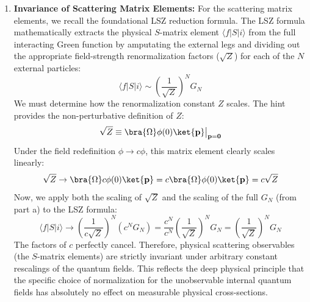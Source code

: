 \begin{enumerate}[label=(\alph*)]
    \item \textbf{Invariance of Scattering Matrix Elements:}
          For the scattering matrix elements, we recall the foundational LSZ reduction formula. The LSZ formula mathematically extracts the physical $S$-matrix element $\langle f | S | i \rangle$ from the full interacting Green function by amputating the external legs and dividing out the appropriate field-strength renormalization factors ($\sqrt{Z}$) for each of the $N$ external particles:
          \[
              \langle f | S | i \rangle \sim \left( \frac{1}{\sqrt{Z}} \right)^N G_N
          \]
          We must determine how the renormalization constant $Z$ scales. The hint provides the non-perturbative definition of $Z$:
          \[
              \sqrt{Z} \equiv \bra{\Omega} \phi(0) \ket{\mathbf{p}} \big|_{\mathbf{p} = \mathbf{0}}
          \]
          Under the field redefinition $\phi \to c\phi$, this matrix element clearly scales linearly:
          \[
              \sqrt{Z} \to \bra{\Omega} c\phi(0) \ket{\mathbf{p}} = c \bra{\Omega} \phi(0) \ket{\mathbf{p}} = c\sqrt{Z}
          \]
          Now, we apply both the scaling of $\sqrt{Z}$ and the scaling of the full $G_N$ (from part a) to the LSZ formula:
          \[
              \langle f | S | i \rangle \to \left( \frac{1}{c\sqrt{Z}} \right)^N (c^N G_N) = \frac{c^N}{c^N} \left( \frac{1}{\sqrt{Z}} \right)^N G_N = \left( \frac{1}{\sqrt{Z}} \right)^N G_N
          \]
          The factors of $c$ perfectly cancel. Therefore, physical scattering observables (the $S$-matrix elements) are strictly invariant under arbitrary constant rescalings of the quantum fields. This reflects the deep physical principle that the specific choice of normalization for the unobservable internal quantum fields has absolutely no effect on measurable physical cross-sections.
\end{enumerate}